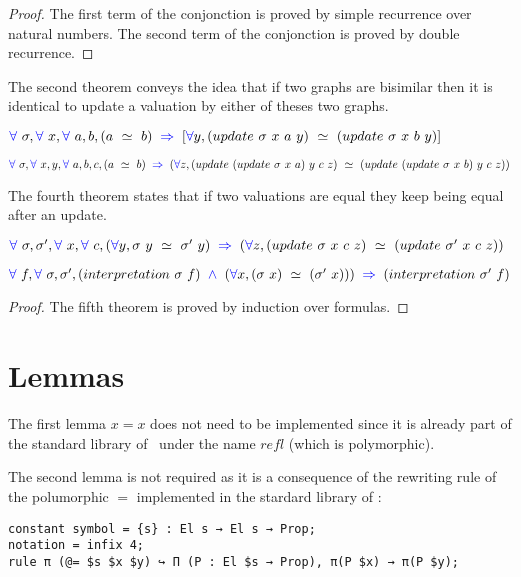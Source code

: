 \documentclass[a4paper]{article}
\begin{document}
\begin{proof}
The first term of the conjonction is proved by simple recurrence over natural numbers. The second term of the conjonction is proved by double recurrence.
\end{proof}

The second theorem conveys the idea that if two graphs are bisimilar then it is identical to update a valuation by either of theses two graphs.

\begin{theorem}
$\fa \ \sigma, \fa \ x, \fa \ a, b, (a \ \simeq \ b) \ \imp \ [\fa y, (update \ \sigma \ x \ a \ y) \ \simeq \ (update \ \sigma \ x \ b \ y)]$
\end{theorem}

\begin{theorem}
$\fa \ \sigma, \fa \ x, y, \fa \ a, b, c, (a \ \simeq \ b) \ \imp \ (\fa z, (update \ (update \ \sigma \ x \ a) \ y \ c \ z) \ \simeq \ (update \  (update \ \sigma \ x \ b) \ y \ c \ z))$
\end{theorem}

The fourth theorem states that if two valuations are equal they keep being equal after an update.

\begin{theorem}
$\fa \ \sigma, \sigma', \fa \ x, \fa \ c, (\fa y, \sigma \ y \ \simeq \ \sigma' \ y) \ \imp \ (\fa z, (update \ \sigma \ x \ c \ z) \ \simeq \ (update \ \sigma' \ x \ c \ z))$
\end{theorem}

\begin{theorem}
$\fa \ f, \fa \ \sigma, \sigma', (interpretation \ \sigma \ f) \ \conj \ (\fa x, (\sigma \ x) \ \simeq \ (\sigma' \ x))) \ \imp \ (interpretation \ \sigma' \ f)$
\end{theorem}

\begin{proof}
The fifth theorem is proved by induction over formulas.
\end{proof}


\section{Lemmas}

The first lemma $x=x$ does not need to be implemented since it is already part of the standard library of \dedukti \ under the name $refl$ (which is polymorphic).

The second lemma is not required as it is a consequence of the rewriting rule of the polumorphic $=$ implemented in the stardard library of \dedukti: 
\begin{lstlisting}
constant symbol = {s} : El s → El s → Prop;
notation = infix 4;
rule π (@= $s $x $y) ↪ Π (P : El $s → Prop), π(P $x) → π(P $y);
\end{lstlisting}
\end{document}

